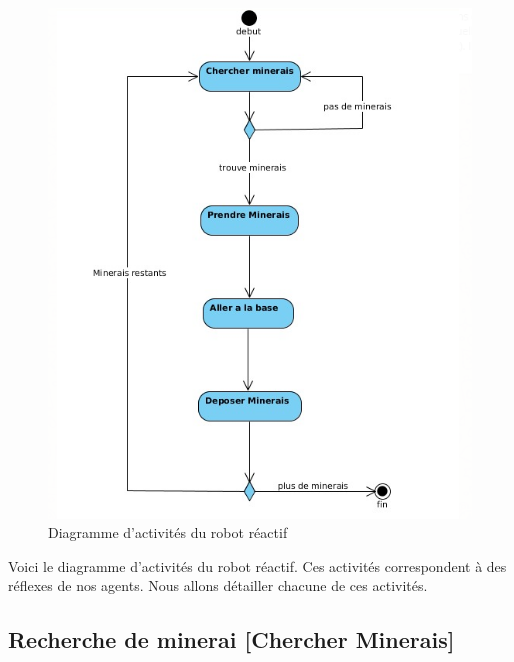 \begin{figure}[!h]
	\begin{center}
		\includegraphics{diagrammes/diagramme_activites_reactif}
	\end{center}
	\caption{Diagramme d'activités du robot réactif}
\end{figure}

Voici le diagramme d'activités du robot réactif. Ces activités correspondent à des réflexes de nos agents. Nous allons détailler chacune de ces activités.

\newpage

\subsection{Recherche de minerai [Chercher Minerais]}

